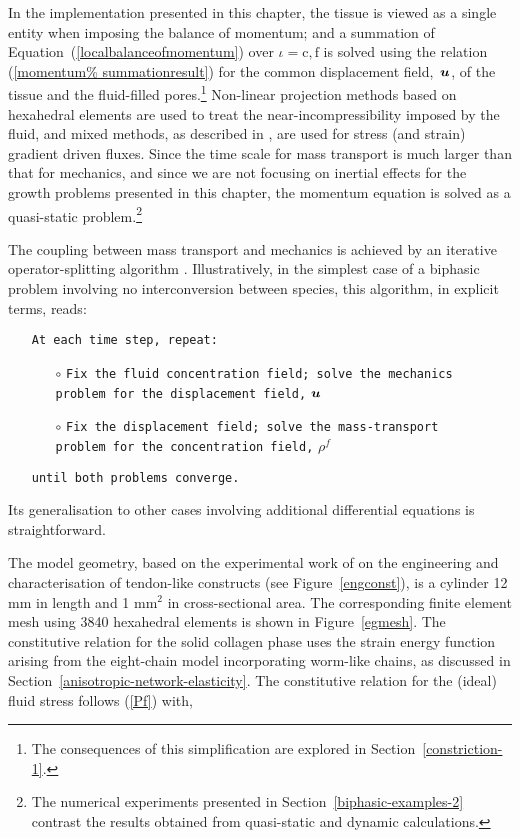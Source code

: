 In the implementation presented in this chapter, the tissue is viewed
as a single entity when imposing the balance of momentum; and a
summation of Equation~(\ref{localbalanceofmomentum}) over
$\iota=\mathrm{c,f}$ is solved using the relation (\ref{momentum%
  summationresult}) for the common displacement \mbox{field, $\mbox{\boldmath$ u$}$,}
of the tissue and the fluid-filled pores.\footnote{The consequences of
  this simplification are explored in Section~\ref{constriction-1}.}
Non-linear projection methods \citep{simotaylorpister:85} based on
hexahedral elements are used to treat the near-incompressibility
imposed by the fluid, and mixed methods, as described in
\cite{Garikipatiox2:01}, are used for stress (and strain) gradient
driven fluxes. Since the time scale for mass transport is much larger
than that for mechanics, and since we are not focusing on inertial
effects for the growth problems presented in this chapter, the
momentum equation is solved as a quasi-static problem.\footnote{The
  numerical experiments presented in Section~\ref{biphasic-examples-2}
  contrast the results obtained from quasi-static and dynamic
  calculations.}

The coupling between mass transport and mechanics is achieved by an
iterative operator-splitting algorithm \citep{Armero-poroplasticity%
  :99, Garikipatietal:01}. Illustratively, in the simplest case of a
biphasic problem involving no interconversion between species, this
algorithm, in explicit terms, reads:

\begin{itemize}
\item[] {\tt At each time step, repeat:}
  \begin{itemize}
  \item[$\circ$] {\tt Fix the fluid concentration field; solve the
    mechanics\\ problem for the displacement field,} $\mbox{\boldmath$ u$}$
  \item[$\circ$] {\tt Fix the displacement field; solve the
    mass-transport\\ problem for the concentration field,} $\rho^f$
  \end{itemize}
\item[]{\tt until both problems converge.}
\end{itemize}

\noindent Its generalisation to other cases involving additional
differential equations is straightforward.

The model geometry, based on the experimental work of \citet{Calve:04}
on the engineering and characterisation of tendon-like constructs (see
Figure~\ref{engconst}), is a cylinder 12 mm in length and 1 mm$^2$ in
cross-sectional area. The corresponding finite element mesh using 3840
hexahedral elements is shown in Figure~\ref{egmesh}. The constitutive
relation for the solid collagen phase uses the strain energy function
arising from the eight-chain model incorporating worm-like chains, as
discussed in Section~\ref{anisotropic-network-elasticity}. The
constitutive relation for the (ideal) fluid stress follows (\ref{Pf})
with,

